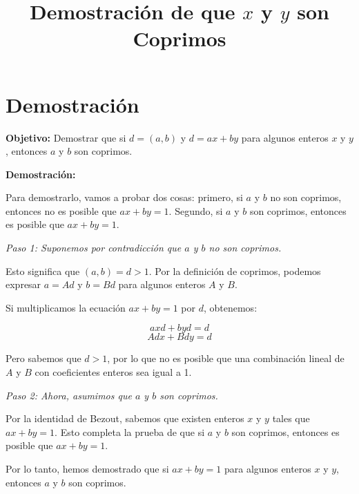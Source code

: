 \documentclass{article}
\begin{document}
\title{Demostración de que \(x\) y \(y\) son Coprimos}
\author{}
\date{}
\maketitle

\section*{Demostración}

\textbf{Objetivo:} Demostrar que si \(d = (a, b)\) y \(d = ax + by\) para algunos enteros \(x\) y \(y\), entonces \(a\) y \(b\) son coprimos.

\textbf{Demostración:}

Para demostrarlo, vamos a probar dos cosas: primero, si \(a\) y \(b\) no son coprimos, entonces no es posible que \(ax + by = 1\). Segundo, si \(a\) y \(b\) son coprimos, entonces es posible que \(ax + by = 1\).

\textit{Paso 1: Suponemos por contradicción que \(a\) y \(b\) no son coprimos.}

Esto significa que \( (a, b) = d > 1 \). Por la definición de coprimos, podemos expresar \(a = Ad\) y \(b = Bd\) para algunos enteros \(A\) y \(B\).

Si multiplicamos la ecuación \(ax + by = 1\) por \(d\), obtenemos:

\[ axd + byd = d \]
\[ Adx + Bdy = d \]

Pero sabemos que \(d > 1\), por lo que no es posible que una combinación lineal de \(A\) y \(B\) con coeficientes enteros sea igual a 1.

\textit{Paso 2: Ahora, asumimos que \(a\) y \(b\) son coprimos.}

Por la identidad de Bezout, sabemos que existen enteros \(x\) y \(y\) tales que \(ax + by = 1\). Esto completa la prueba de que si \(a\) y \(b\) son coprimos, entonces es posible que \(ax + by = 1\).

Por lo tanto, hemos demostrado que si \(ax + by = 1\) para algunos enteros \(x\) y \(y\), entonces \(a\) y \(b\) son coprimos.
\end{document}
